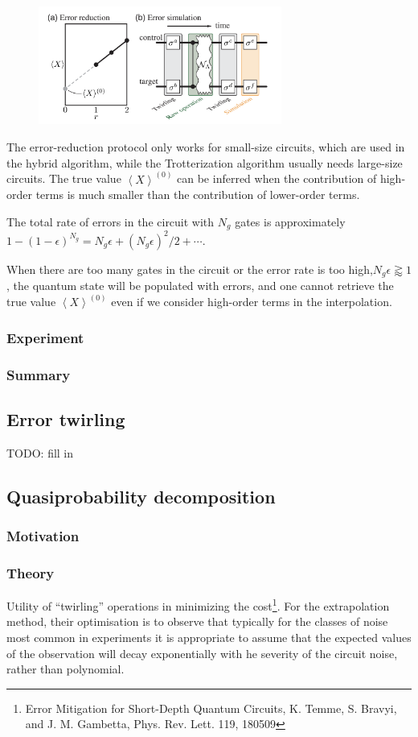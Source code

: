 \documentclass[11pt, oneside]{article}   	%
\begin{document}
\begin{figure}[t]
\includegraphics[width=8cm]{./img/PRX7_021050}
\centering
\end{figure}

The error-reduction protocol only works for small-size circuits, which are used in the hybrid algorithm, while the Trotterization algorithm usually needs large-size circuits. 
The true value $\left< X \right>^{(0)}$ can be inferred when the contribution of high-order terms is much smaller than the contribution of lower-order terms.

The total rate of errors in the circuit with $N_g$ gates is approximately $1 - (1 - \epsilon)^{N_g} = N_g \epsilon + (N_g \epsilon)^2 / 2 + \cdots$.

When there are too many gates in the circuit or the error rate is too high,$N_g \epsilon \gtrapprox 1$, the quantum state will be populated with errors, and one cannot retrieve the true value $\left< X \right>^{(0)}$ even if we consider high-order terms in the interpolation.

\subsubsection{Experiment}
\subsubsection{Summary}

\subsection{Error twirling}
TODO: fill in

\subsection{Quasiprobability decomposition}
\subsubsection{Motivation}
\subsubsection{Theory}
Utility of ``twirling'' operations in minimizing the cost\footnote{Error Mitigation for Short-Depth Quantum Circuits, K. Temme, S. Bravyi, and J. M. Gambetta, Phys. Rev. Lett. 119, 180509}.
For the extrapolation method, their optimisation is to observe that typically for the classes of noise most common in experiments it is appropriate to assume that the expected values of the observation will decay exponentially with he severity of the circuit noise, rather than polynomial.
\end{document}
